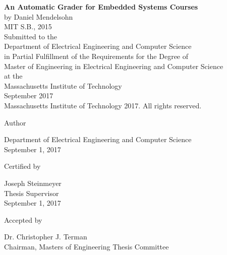 \documentclass[12pt]{article}
\newcommand{\mytitle}{\textbf{An Automatic Grader for Embedded Systems Courses}}
\newcommand{\mydate}{September 1, 2017}
\begin{document}
\begin{titlepage}

\centering
\mytitle \\
\vspace{12pt}
by Daniel Mendelsohn \\
MIT S.B., 2015 \\
\vspace{12pt}
Submitted to the \\
Department of Electrical Engineering and Computer Science \\
in Partial Fulfillment of the Requirements for the Degree of \\
\vspace{12pt}
Master of Engineering in Electrical Engineering and Computer Science \\
\vspace{12pt}
at the \\
\vspace{12pt}
Massachusetts Institute of Technology \\
\vspace{12pt}
September 2017 \\
\vspace{12pt}
\textcopyright \hspace{0.05in} Massachusetts Institute of Technology 2017.  All rights reserved. \\
\vspace{48pt}

Author \dotfill \\
\begin{flushright}
Department of Electrical Engineering and Computer Science \\
\mydate
\end{flushright}
\vspace{36pt}

Certified by \dotfill \\
\begin{flushright}
Joseph Steinmeyer \\
Thesis Supervisor \\
\mydate
\end{flushright}
\vspace{24pt}

Accepted by \dotfill \\
\begin{flushright}
Dr. Christopher J. Terman \\
Chairman, Masters of Engineering Thesis Committee
\end{flushright}

\end{titlepage}
\end{document}
